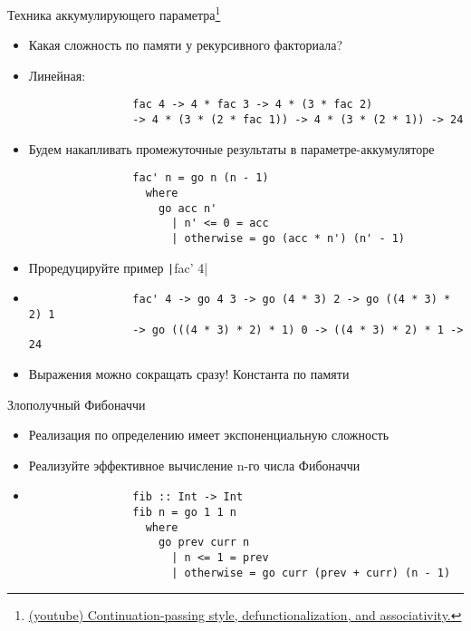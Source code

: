     \begin{frame}[fragile]{Техника аккумулирующего параметра\footnote{\href{https://youtu.be/8gnhaE2nmQ0?si=A8lDF9pJqa_07x9q}{\color{blue} \advanced (youtube) Continuation-passing style, defunctionalization, and associativity.}}}
        \begin{itemize}
            \item[\todo] Какая сложность по памяти у рекурсивного факториала?
            \item[\answer] \pause Линейная:
            \begin{verbatim}
                fac 4 -> 4 * fac 3 -> 4 * (3 * fac 2)
                -> 4 * (3 * (2 * fac 1)) -> 4 * (3 * (2 * 1)) -> 24
            \end{verbatim}
            \item Будем накапливать промежуточные результаты в параметре-аккумуляторе
            \begin{verbatim}
                fac' n = go n (n - 1)
                  where
                    go acc n'
                      | n' <= 0 = acc
                      | otherwise = go (acc * n') (n' - 1)
            \end{verbatim}
            \item[\todo] Проредуцируйте пример \texttt|fac' 4|
            \item[\answer] \pause
            \begin{verbatim}
                fac' 4 -> go 4 3 -> go (4 * 3) 2 -> go ((4 * 3) * 2) 1
                -> go (((4 * 3) * 2) * 1) 0 -> ((4 * 3) * 2) * 1 -> 24
            \end{verbatim}
            \item Выражения можно сокращать сразу! Константа по памяти
        \end{itemize}
    \end{frame}

    \begin{frame}[fragile]{Злополучный Фибоначчи}
        \begin{itemize}
            \item Реализация по определению имеет экспоненциальную сложность
            \item[\todo] Реализуйте эффективное вычисление n-го числа Фибоначчи
            \item[\answer] \pause
            \begin{verbatim}
                fib :: Int -> Int
                fib n = go 1 1 n
                  where
                    go prev curr n
                      | n <= 1 = prev
                      | otherwise = go curr (prev + curr) (n - 1)
            \end{verbatim}
        \end{itemize}
    \end{frame}


